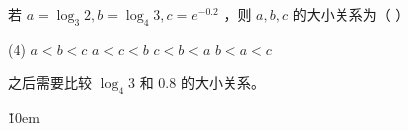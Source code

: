 \begin{example}
    若 $a=\log _3 2, b=\log _4 3, c=e^{-0.2}$ ，则 $a, b, c$ 的大小关系为（ \quad）
    \begin{tasks}(4)
        \task $a<b<c$
        \task $a<c<b$
        \task $c<b<a$
        \task $b<a<c$
    \end{tasks}
\end{example}

\begin{tips}
    之后需要比较 $\log _4 3$ 和 $0.8$ 的大小关系。
\end{tips}

\v{10em}
